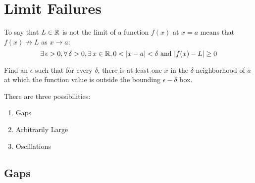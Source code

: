 \documentclass[letterpaper,12pt,fleqn]{article}
\newcommand{\e}{\epsilon}
\renewcommand{\d}{\delta}
\begin{document}
\section*{Limit Failures}

\begin{definition}
  To say that \(L\in\mathbb{R}\) is not the limit of a function \(f(x)\) at \(x=a\) means that \(f(x)\not\to L\) as
  \(x\to a\):
  \[\exists\,\e>0,\forall\,\d>0,\exists\,x\in\R,0<\abs{x-a}<\d\ \text{and}\ \abs{f(x)-L}\ge0\]
\end{definition}

Find an \(\e\) such that for every \(\d\), there is at least one \(x\) in the \(\d\)-neighborhood of \(a\) at which
the function value is outside the bounding \(\e-\d\) box.

There are three possibilities:
\begin{enumerate}
\item Gaps
\item Arbitrarily Large
\item Oscillations
\end{enumerate}

\subsection*{Gaps}
\end{document}
